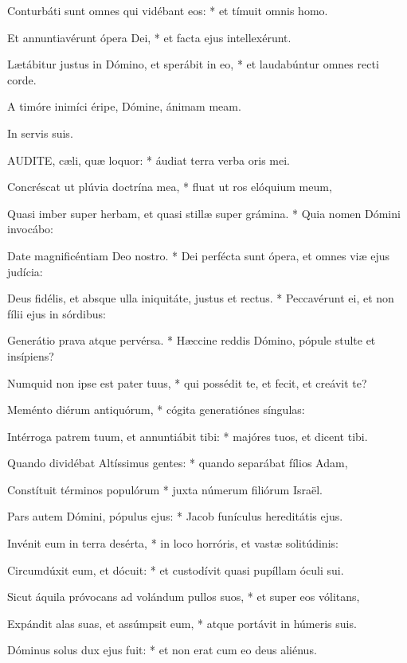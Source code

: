 Conturbáti sunt omnes qui vidébant eos: * et tímuit omnis homo.

Et annuntiavérunt ópera Dei, * et facta ejus intellexérunt.

Lætábitur justus in Dómino, et sperábit in eo, * et laudabúntur omnes recti corde.


 A timóre inimíci éripe, Dómine, ánimam meam.

 In servis suis.


\lettrine[lines=2]{A}{UDITE}, cæli, quæ loquor: * áudiat terra verba oris mei.

Concréscat ut plúvia doctrína mea, * fluat ut ros elóquium meum,

Quasi imber super herbam, et quasi stillæ super grámina. * Quia nomen Dómini invocábo:

Date magnificéntiam Deo nostro. * Dei perfécta sunt ópera, et omnes viæ ejus judícia:

Deus fidélis, et absque ulla iniquitáte, justus et rectus. * Peccavérunt ei, et non fílii ejus in sórdibus:

Generátio prava atque pervérsa. * Hæccine reddis Dómino, pópule stulte et insípiens?

Numquid non ipse est pater tuus, * qui possédit te, et fecit, et creávit te?

Meménto diérum antiquórum, * cógita generatiónes síngulas:

Intérroga patrem tuum, et annuntiábit tibi: * majóres tuos, et dicent tibi.

Quando dividébat Altíssimus gentes: * quando separábat fílios Adam,

Constítuit términos populórum * juxta númerum filiórum Israël.

Pars autem Dómini, pópulus ejus: * Jacob funículus hereditátis ejus.

Invénit eum in terra desérta, * in loco horróris, et vastæ solitúdinis:

Circumdúxit eum, et dócuit: * et custodívit quasi pupíllam óculi sui.

Sicut áquila próvocans ad volándum pullos suos, * et super eos vólitans,

Expándit alas suas, et assúmpsit eum, * atque portávit in húmeris suis.

Dóminus solus dux ejus fuit: * et non erat cum eo deus aliénus.

